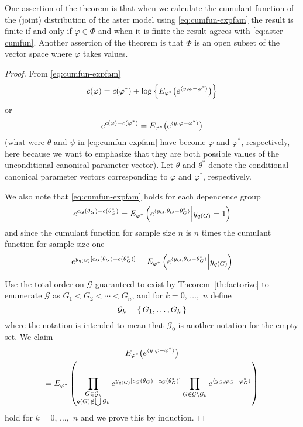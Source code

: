 One assertion of the theorem is that when we calculate the cumulant
function of the (joint) distribution of the aster model
using \eqref{eq:cumfun-expfam} the result is finite if and only if
$\varphi \in \Phi$ and when it is finite the result agrees with
\eqref{eq:aster-cumfun}.
Another assertion of the theorem is that $\Phi$ is an open subset of
the vector space where $\varphi$ takes values.

\begin{proof}
From \eqref{eq:cumfun-expfam}
$$
   c(\varphi)
   =
   c(\varphi^*) + \log\left\{
   E_{\varphi^*}\bigl( e^{\langle y, \varphi - \varphi^* \rangle} \bigr) \right\}
$$
or
\begin{equation} \label{eq:cumfun-reg-one}
   e^{c(\varphi) - c(\varphi^*)}
   =
   E_{\varphi^*}\bigl( e^{\langle y, \varphi - \varphi^* \rangle} \bigr)
\end{equation}
(what were $\theta$ and $\psi$ in \eqref{eq:cumfun-expfam} have
become $\varphi$ and $\varphi^*$, respectively,
here because we want to emphasize that they are both possible values
of the unconditional canonical parameter vector).
Let $\theta$ and $\theta^*$ denote the conditional canonical parameter
vectors corresponding to $\varphi$ and $\varphi^*$, respectively.

We also note that \eqref{eq:cumfun-expfam} holds for each dependence group
\begin{equation} \label{eq:cumfun-reg-too}
   e^{c_G(\theta_G) - c(\theta_G^*)}
   =
   E_{\varphi^*}\left(
   e^{\langle y_G, \theta_G - \theta_G^* \rangle} \middle| y_{q(G)} = 1 \right)
\end{equation}
and since the cumulant function for sample size $n$ is $n$ times the cumulant
function for sample size one
\begin{equation} \label{eq:cumfun-reg-too-too}
   e^{y_{q(G)} [c_G(\theta_G) - c(\theta_G^*)]}
   =
   E_{\varphi^*}\left(
   e^{\langle y_G, \theta_G - \theta_G^* \rangle} \middle| y_{q(G)} \right)
\end{equation}

Use the total order on $\mathcal{G}$ guaranteed
to exist by Theorem~\ref{th:factorize}
to enumerate $\mathcal{G}$ as $G_1 < G_2 < \cdots < G_n$,
and for $k = 0$, $\ldots,$ $n$ define
$$
   \mathcal{G}_k = \{\,  G_1, \ldots, G_k  \,\}
$$
where the notation is intended to mean that $\mathcal{G}_0$ is another
notation for the empty set.  We claim
\begin{multline} \label{eq:reg-induction}
   E_{\varphi^*}\bigl( e^{\langle y, \varphi - \varphi^* \rangle} \bigr)
   \\
   =
   E_{\varphi^*}\left(
   \prod_{\substack{G \in \mathcal{G}_k \\ q(G) \notin \bigcup \mathcal{G}_k}}
   e^{y_{q(G)} [c_G(\theta_G) - c_G(\theta_G^*)]}
   \prod_{G \in \mathcal{G} \setminus \mathcal{G}_k}
   e^{\langle y_G, \varphi_G - \varphi_G^* \rangle}
   \right)
\end{multline}
hold for $k = 0$, $\ldots,$ $n$ and we prove this by induction.


\end{proof}
